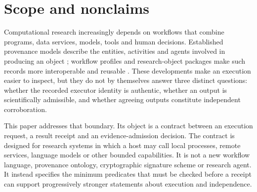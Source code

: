\begin{abstract}
Tool-using research systems can produce an answer and a detailed execution trace
while leaving unresolved who executed the work, which evidence was available,
whether agreeing runs were independent, and whether infrastructure failure was
admitted as scientific evidence. We define a fail-closed execution contract that
separates request identity, result integrity, executor attribution, evidence
admission and scientific authority. Frozen bounded studies test that separation.
The artifact checker rejects all six registered committed-artifact corruptions
and accepts all six semantics-preserving re-encodings. At fixed three-link length,
one compromised key domain permits four of four forged chains, whereas two or
three independent cryptographic domains permit none. Full key-set compromise
remains the decisive adverse control: signatures detect zero of six forgeries and
an unscoped chain-as-science rule false-promotes all six. A 22-case W3C PROV and
RO-Crate/Workflow-Run study preserves the normalized execution vector without
leaking scientific fields, and native/imported status interpretation agrees on
22/22. Process-kill tests show that a valid stale artifact can remain green after
the current invocation fails, so liveness requires a separate occurrence binding.
These are finite execution-integrity, provenance and attestation results, not a
general reliability, key-custody, production-scale, or scientific-truth claim.
\end{abstract}

\section{Scope and nonclaims}

Computational research increasingly depends on workflows that combine programs,
data services, models, tools and human decisions. Established provenance models
describe the entities, activities and agents involved in producing an object
\citep{moreau2013prov}; workflow profiles and research-object packages make such
records more interoperable and reusable \citep{khan2019cwlprov,soilandreyes2022rocrate,leo2024workflowrun}.
These developments make an execution easier to inspect, but they do not by
themselves answer three distinct questions: whether the recorded executor identity
is authentic, whether an output is scientifically admissible, and whether agreeing
outputs constitute independent corroboration.

This paper addresses that boundary. Its object is a contract between an execution
request, a result receipt and an evidence-admission decision. The contract is
designed for research systems in which a host may call local processes, remote
services, language models or other bounded capabilities. It is not a new workflow
language, provenance ontology, cryptographic signature scheme or research agent.
It instead specifies the minimum predicates that must be checked before a receipt
can support progressively stronger statements about execution and independence.

